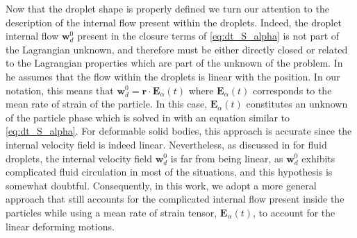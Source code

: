 Now that the droplet shape is properly defined we turn our attention to the description of the internal flow present within the droplets.
Indeed, the droplet internal flow $\textbf{w}_d^0$ present in the closure terms of \ref{eq:dt_S_alpha} is not part of the Lagrangian unknown, and therefore must be either directly closed or related to the Lagrangian properties which are part of the unknown of the problem.  
In \citet{lhuillier1987phenomenology} he assumes that the flow within the droplets is linear with the position. 
In our notation, this means that $\textbf{w}_d^0 = \textbf{r}\cdot \textbf{E}_\alpha(t)$ where $\textbf{E}_\alpha(t)$ corresponds to the mean rate of strain of the particle. 
In this case, $\textbf{E}_\alpha(t)$ constitutes an unknown of the particle phase which is solved in \citet{lhuillier1987phenomenology} with an equation similar to \ref{eq:dt_S_alpha}. 
For deformable solid bodies, this approach is accurate since the internal velocity field is indeed linear.
Nevertheless, as discussed in \citet{lhuillier1987phenomenology} for fluid droplets, the internal velocity field $\textbf{w}_d^0$ is far from being linear, as $\textbf{w}_d^0$ exhibits complicated fluid circulation in most of the situations, and this hypothesis is somewhat doubtful. 
Consequently, in this work, we adopt a more general approach that still accounts for the complicated internal flow present inside the particles while using a mean rate of strain tensor, $\textbf{E}_\alpha(t)$, to account for the linear deforming motions. 

